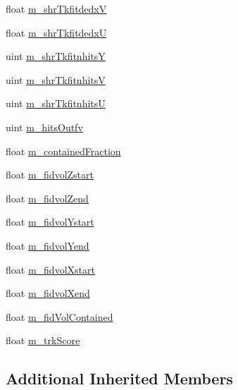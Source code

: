 \begin{DoxyCompactItemize}
\item 
float \hyperlink{classselection_1_1CCincSelection_afd1502883efc2504917a3b17eeb4aa46}{m\-\_\-shr\-Tkfitdedx\-V}
\item 
float \hyperlink{classselection_1_1CCincSelection_aaa3a14c43d0e840fa3032a46bd498db1}{m\-\_\-shr\-Tkfitdedx\-U}
\item 
uint \hyperlink{classselection_1_1CCincSelection_a63f55e51e3df0e108aace93b3c34c153}{m\-\_\-shr\-Tkfitnhits\-Y}
\item 
uint \hyperlink{classselection_1_1CCincSelection_a8ad70697906b08285a218c739e8c4815}{m\-\_\-shr\-Tkfitnhits\-V}
\item 
uint \hyperlink{classselection_1_1CCincSelection_a3617f2e35ecc3cd9ceb53108b4c288cb}{m\-\_\-shr\-Tkfitnhits\-U}
\item 
uint \hyperlink{classselection_1_1CCincSelection_ac839d87e0a429876df355fee2a561e60}{m\-\_\-hits\-Outfv}
\item 
float \hyperlink{classselection_1_1CCincSelection_a5ac3c52c6a88691182c3b3c6594d9744}{m\-\_\-contained\-Fraction}
\item 
float \hyperlink{classselection_1_1CCincSelection_a291cc5986c0861bf1883ec1c41457afd}{m\-\_\-fidvol\-Zstart}
\item 
float \hyperlink{classselection_1_1CCincSelection_a2510a29ed7584b2d56eb8dff636ceee6}{m\-\_\-fidvol\-Zend}
\item 
float \hyperlink{classselection_1_1CCincSelection_a28900415eda1eb30d6263081e943e6a5}{m\-\_\-fidvol\-Ystart}
\item 
float \hyperlink{classselection_1_1CCincSelection_a01d6a0608356e4ea245f23e1b6934fd3}{m\-\_\-fidvol\-Yend}
\item 
float \hyperlink{classselection_1_1CCincSelection_aab38faac4866d19339aadbc3ac1eb55b}{m\-\_\-fidvol\-Xstart}
\item 
float \hyperlink{classselection_1_1CCincSelection_ae4bab4cf8ea55e54fcdaa66d2fe44c1d}{m\-\_\-fidvol\-Xend}
\item 
float \hyperlink{classselection_1_1CCincSelection_a3412d86b03a97a65fed3d5d8a41ed2c0}{m\-\_\-fid\-Vol\-Contained}
\item 
float \hyperlink{classselection_1_1CCincSelection_a2c3b80516e3731ec9b4f5ccbee6864ba}{m\-\_\-trk\-Score}
\end{DoxyCompactItemize}
\subsection*{Additional Inherited Members}


